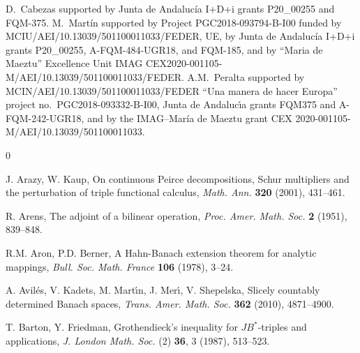 \documentclass[10pt]{amsart}
\begin{document}
D.~Cabezas supported by Junta de Andaluc\'ia I+D+i grants P20\_00255 and FQM-375.
M.~Mart\'in supported by Project PGC2018-093794-B-I00 funded by MCIU/AEI/10.13039/501100011033/FEDER, UE, by Junta de Andaluc\'ia I+D+i grants P20\_00255, A-FQM-484-UGR18, and FQM-185, and by ``Maria de Maeztu'' Excellence Unit IMAG CEX2020-001105-M/AEI/10.13039/501100011033/FEDER. A.M.~Peralta supported by MCIN/AEI/10.13039/501100011033/FEDER ``Una manera de hacer Europa'' project no.\ PGC2018-093332-B-I00, Junta de Andaluc\'{\i}a grants FQM375 and  A-FQM-242-UGR18, and by the IMAG--Mar{\'i}a de Maeztu grant CEX 2020-001105-M/AEI/10.13039/501100011033.
	
	\begin{thebibliography}{0}
		
		
		 J. Arazy, W. Kaup, On continuous Peirce decompositions, Schur multipliers and the perturbation of triple functional calculus, \emph{Math. Ann.} \textbf{320} (2001), 431--461.	
		
		 {\sc R. Arens}, The adjoint of a bilinear operation, \emph{Proc. Amer. Math. Soc.} \textbf{2} (1951), 839--848.
		
		 R.M. Aron, P.D. Berner, A Hahn-Banach extension theorem for analytic mappings, \emph{Bull. Soc. Math. France} \textbf{106} (1978), 3--24.
		
		
		 A. Avil\'{e}s, V. Kadets, M. Mart\'{\i}n, J. Mer\'{\i}, V. Shepelska, Slicely countably determined Banach spaces, \emph{Trans. Amer. Math. Soc.} \textbf{362} (2010), 4871--4900.
		
		
		 T. Barton, Y. Friedman, Grothendieck's inequality for {$JB^*$}-triples and applications, {\em J. London Math. Soc.} (2) \textbf{36}, 3 (1987), 513--523.
		

\end{thebibliography}
\end{document}
